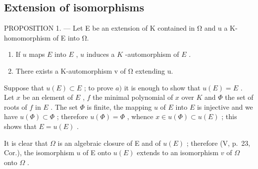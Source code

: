\subsection{Extension of isomorphisms}

PROPOSITION 1. --- Let E be an extension of K contained in Ω and u a K-homomorphism of E into Ω.

\begin{enumerate}
\def\labelenumi{\alph{enumi})}
\item
  If \(u\) maps \(E\) into \(E\) , \(u\) induces a \(K\) -automorphism of \(E\) .
\item
  There exists a K-automorphism v of Ω extending u.
\end{enumerate}

Suppose that \(u(E) \subset E\) ; to prove \(a)\) it is enough to show that \(u(E) = E\) . Let \(x\) be an element of \(E\) , \(f\) the minimal polynomial of \(x\) over \(K\) and \(\Phi\) the set of roots of \(f\) in \(E\) . The set \(\Phi\) is finite, the mapping \(u\) of \(E\) into \(E\) is injective and we have \(u(\Phi) \subset \Phi\) ; therefore \(u(\Phi) = \Phi\) , whence \(x \in u(\Phi) \subset u(E)\) ; this shows that \(E = u(E)\) .

It is clear that \(\Omega\) is an algebraic closure of E and of \(u(E)\) ; therefore (V, p.~23, Cor.), the isomorphism \(u\) of E onto \(u(E)\) extends to an isomorphism \(v\) of \(\Omega\) onto \(\Omega\) .

